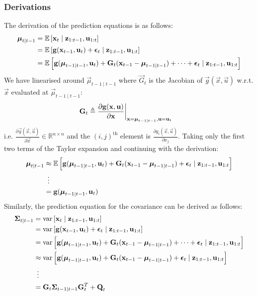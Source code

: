 \subsubsection{Derivations}
The derivation of the prediction equations is as follows:
\begin{align}
	\vec \mu_{t \mid t - 1}	&= \E\left[\vec x_t \mid \vec z_{1:t - 1}, \vec u_{1:t}\right] \\
							&= \E\left[\vec g(\vec x_{t - 1}, \vec u_t) + \vec \epsilon_t \mid \vec z_{1:t - 1}, \vec u_{1:t}\right] \\
							&= \E\left[\vec g(\vec \mu_{t - 1 \mid t - 1}, \vec u_t) + \vec G_t (\vec x_{t - 1} - \vec \mu_{t - 1 \mid t - 1}) + \cdots + \vec \epsilon_t \mid \vec z_{1:t - 1}, \vec u_{1:t}\right]
\end{align}
We have linearised around $\vec \mu_{t - 1 \mid t - 1}$ where $\vec G_t$ is the Jacobian of $\vec g(\vec x, \vec u)$ w.r.t. $\vec x$ evaluated at $\vec \mu_{t - 1 \mid t - 1}$:
\begin{align}
	\vec G_t	&\triangleq \frac{\partial \vec g(\vec x, \vec u)}{\partial \vec x}\at[\bigg]{\vec x = \vec \mu_{t - 1 \mid t - 1}, \vec u = \vec u_t}
\end{align}
i.e. $\frac{\partial \vec g(\vec x, \vec u)}{\partial \vec x} \in \mathbb R^{n \times n}$ and the $(i, j)^{\text{th}}$ element is $\frac{\partial g_i(\vec x, \vec u)}{\partial x_j}$. Taking only the first two terms of the Taylor expansion and continuing with the derivation:
\begin{align}
	\vec \mu_{t \mid t - 1}	&\approx \E\left[\vec g(\vec \mu_{t - 1 \mid t - 1}, \vec u_t) + \vec G_t (\vec x_{t - 1} - \vec \mu_{t - 1 \mid t - 1}) + \vec \epsilon_t \mid \vec z_{1:t - 1}, \vec u_{1:t}\right] \\
							&\,\,\,\vdots \\
							&= \vec g(\vec \mu_{t - 1 \mid t - 1}, \vec u_t)
\end{align}
Similarly, the prediction equation for the covariance can be derived as follows:
\begin{align}
	\vec \Sigma_{t \mid t - 1}	&= \var\left[\vec x_t \mid \vec z_{1:t - 1}, \vec u_{1:t}\right] \\
								&= \var\left[\vec g(\vec x_{t - 1}, \vec u_t) + \vec \epsilon_t \mid \vec z_{1:t - 1}, \vec u_{1:t}\right] \\
								&= \var\left[\vec g(\vec \mu_{t - 1 \mid t - 1}, \vec u_t) + \vec G_t (\vec x_{t - 1} - \vec \mu_{t - 1 \mid t - 1}) + \cdots + \vec \epsilon_t \mid \vec z_{1:t - 1}, \vec u_{1:t}\right] \\
								&\approx \var\left[\vec g(\vec \mu_{t - 1 \mid t - 1}, \vec u_t) + \vec G_t (\vec x_{t - 1} - \vec \mu_{t - 1 \mid t - 1}) + \vec \epsilon_t \mid \vec z_{1:t - 1}, \vec u_{1:t}\right] \\
								&\,\,\,\vdots \\
								&= \vec G_t \vec \Sigma_{t - 1 \mid t - 1} \vec G_t^T + \vec Q_t
\end{align}

